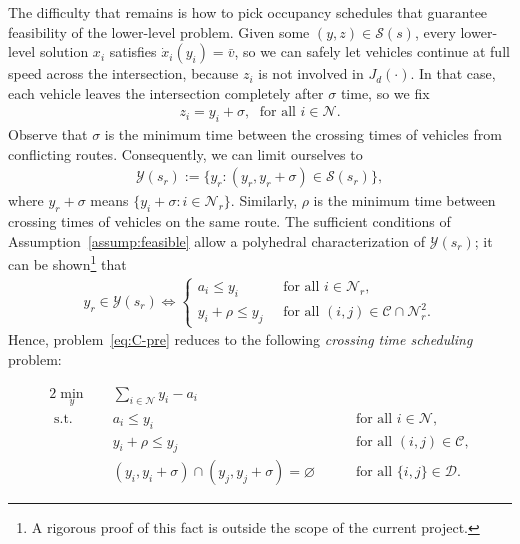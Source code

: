 \documentclass{report}
\theoremstyle{definition}
\theoremstyle{plain}
\begin{document}
The difficulty that remains is how to pick occupancy schedules that guarantee
feasibility of the lower-level problem.
%
Given some $(y,z) \in \mathcal{S}(s)$, every lower-level solution $x_{i}$
satisfies $\dot{x}_{i}(y_{i}) = \bar{v}$, so we can safely let vehicles continue
at full speed across the intersection, because $z_{i}$ is not involved in
$J_d(\cdot)$.
%
In that case, each vehicle leaves the intersection completely after
$\sigma$ time, so we fix
\begin{align*}
  z_{i} = y_{i} + \sigma, \; \text{ for all } i \in \mathcal{N} .
\end{align*}
%
Observe that $\sigma$ is the minimum time between the crossing times of
vehicles from conflicting routes.
%
Consequently, we can limit ourselves to
\begin{align}
  \label{eq:1}
  \mathcal{Y}(s_{r}) := \{ y_{r} : (y_{r}, y_{r} + \sigma) \in \mathcal{S}(s_{r}) \} ,
\end{align}
where $y_{r} + \sigma$ means $\{y_{i} + \sigma : i \in \mathcal{N}_{r}\}$.
%
Similarly, $\rho$ is the minimum time between crossing times of vehicles on the
same route.
% 
The sufficient conditions of Assumption~\ref{assump:feasible} allow a polyhedral characterization
of $\mathcal{Y}(s_r)$; it can be shown\footnote{A rigorous proof of this fact is
  outside the scope of the current project.} that
%
\begin{align}\label{eq:feasibility-inequalities}
 y_{r} \in \mathcal{Y}(s_{r}) \iff
 \begin{cases}
  a_{i} \leq y_i & \; \text{ for all } i \in \mathcal{N}_{r} , \\
  y_i + \rho \leq y_j & \; \text{ for all } (i,j) \in \mathcal{C} \cap \mathcal{N}^2_{r} .
  \end{cases}
\end{align}
%
Hence, problem~\eqref{eq:C-pre} reduces to the following \textit{crossing time scheduling} problem:

\begin{mdframed}
\vspace{-\abovedisplayskip}
\begin{alignat}{2}\label{eq:C}
  \min_{y} \quad & \sum_{i \in \mathcal{N}} y_i - a_i \tag{C} \\
  \text{ s.t. } \quad & a_{i} \leq y_i  && \quad \text{ for all } i \in \mathcal{N} , \tag{C.1} \\
                    & y_i + \rho \leq y_{j}  && \quad \text{ for all } (i,j) \in \mathcal{C} \label{eq:conjunctive} , \tag{C.2} \\
                    & (y_{i}, y_i + \sigma) \cap (y_{j}, y_j + \sigma) = \varnothing && \quad \text{ for all } \{i,j\} \in \mathcal{D} \label{eq:disjunctive} \tag{C.3}.
\end{alignat}
\end{mdframed}
\end{document}
